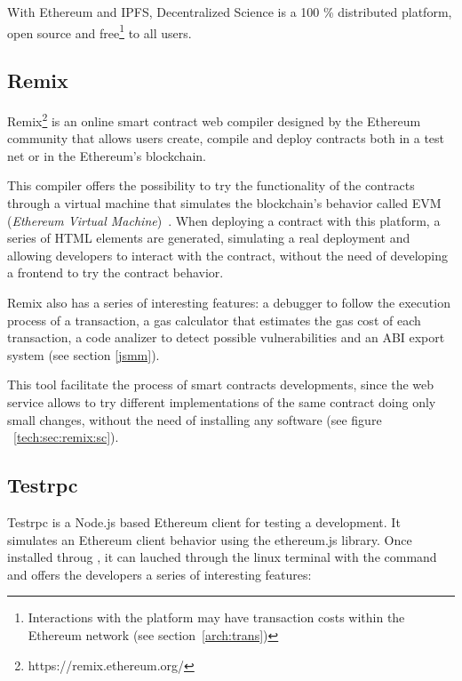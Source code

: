 With Ethereum and IPFS, Decentralized Science is a 100 \% distributed platform,
open source and free\footnote{Interactions with the platform may have
  transaction costs within the Ethereum network (see section~\ref{arch:trans})
  \nopagebreak} to all users.


\subsection{Remix}
Remix\footnote{https://remix.ethereum.org/} is an online smart
contract web compiler designed by the Ethereum community that allows users
create, compile and deploy contracts both in a test net or in the Ethereum's
blockchain.

This compiler offers the possibility to try the functionality of the contracts
through a virtual machine that simulates the blockchain's behavior called EVM
(\emph{Ethereum Virtual Machine})~\cite{hildenbrandt2017kevm}. When deploying a
contract with this platform, a series of HTML elements are generated, simulating
a real deployment and allowing developers to interact with the contract, without
the need of developing a frontend to try the contract behavior.

Remix also has a series of interesting features: a debugger to follow the
execution process of a transaction, a gas calculator that estimates the gas cost
of each transaction, a code analizer to detect possible vulnerabilities and an
ABI export system (see section \ref{jsmm}).

This tool facilitate the process of smart contracts developments, since the web
service allows to try different implementations of the same contract doing only
small changes, without the need of installing any software (see figure
~\ref{tech:sec:remix:sc}).

\subsection{Testrpc}
\label{testrpc}
 Testrpc is a Node.js based Ethereum client for
testing a development. It simulates an Ethereum client behavior using the
ethereum.js library. Once installed throug , it can lauched through
the linux terminal with the command  and offers the developers a
series of interesting features:

